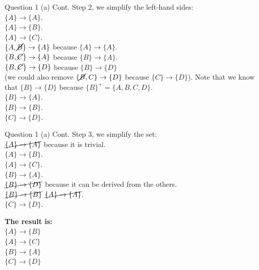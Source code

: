 \begin{frame}[fragile]{Question 1 (a) Cont.}
	Step 2, we simplify the left-hand sides:\\\vspace{3pt}
	$\{A\} \rightarrow \{A\}$.\\	
	$\{A\} \rightarrow \{B\}$.\\	
	$\{A\} \rightarrow \{C\}$.\\	
	$\{A,\cancel{B}\} \rightarrow \{A\}$ because $\{A\} \rightarrow \{A\}$.\\	
	$\{B, \cancel{C}\} \rightarrow \{A\}$ because $\{B\} \rightarrow \{A\}$.\\	
	$\{B, \cancel{C}\} \rightarrow \{D\}$ because $\{B\} \rightarrow \{D\}$ \\\vspace{3pt}
	(we could also remove $\{\cancel{B}, C\} \rightarrow \{D\}$ because $\{C\} \rightarrow \{D\}$). Note that we know that $\{B\} \rightarrow \{D\}$ because $\{B\}^{+}= \{A, B, C, D\}$.\\\vspace{3pt}
	$\{B\} \rightarrow \{A\}$.\\
	$\{B\} \rightarrow \{B\}$.\\
	$\{C\} \rightarrow \{D\}$.
\end{frame}

\begin{frame}[fragile]{Question 1 (a) Cont.}
	Step 3, we simplify the set:\\\vspace{3pt}
	$\cancel{\{A\} \rightarrow \{A\}}$ because it is trivial.\\	
	$\{A\} \rightarrow \{B\}$.\\	
	$\{A\} \rightarrow \{C\}$.\\	
	$\{B\} \rightarrow \{A\}$.\\	
	$\cancel{\{B\} \rightarrow \{D\}}$ because it can be derived from the others.\\	
	$\cancel{\{B\} \rightarrow \{B\}}$ $\cancel{\{A\} \rightarrow \{A\}}$.\\	
	$\{C\} \rightarrow \{D\}$.\\\vspace{5pt}
	
	\textbf{The result is:} \\\vspace{3pt}
	$\{A\} \rightarrow \{B\}$\\	
	$\{A\} \rightarrow \{C\}$\\	
	$\{B\} \rightarrow \{A\}$\\
	$\{C\} \rightarrow \{D\}$
\end{frame}

